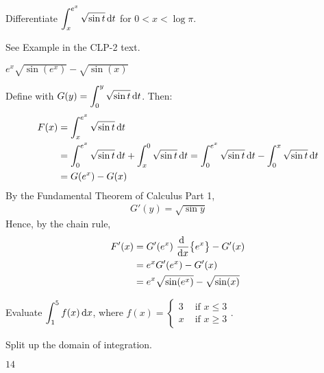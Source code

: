 \begin{question}[2014D]
Differentiate
$\displaystyle \int_x^{e^x} \sqrt{\sin t}\,\mathrm{d}t$ for $0<x<\log \pi$.
\end{question}

\begin{hint}
See Example  in the
CLP-2 text.
\end{hint}

\begin{answer}
$e^x\sqrt{\sin(e^x)} -\sqrt{\sin(x)}$
\end{answer}

\begin{solution}
Define
with
$G(y) = \displaystyle\int_0^y \sqrt{\sin t}\,\mathrm{d}t$.
Then:
\begin{align*}
F(x)&=\int_x^{e^x} \sqrt{\sin t}\,\mathrm{d}t \\
&= \int_0^{e^x} \sqrt{\sin t}\,\mathrm{d}t + \int_x^0 \sqrt{\sin t}\,\mathrm{d}t
= \int_0^{e^x} \sqrt{\sin t}\,\mathrm{d}t - \int_0^x \sqrt{\sin t}\,\mathrm{d}t \\
&=G(e^x) - G(x)
\end{align*}
By the Fundamental Theorem of Calculus Part 1,
\begin{align*}
G'(y)=\sqrt{\sin y}\qquad
\end{align*}
Hence, by the chain rule,
\begin{align*}
F'(x) &= G'(e^x)\ \diff{}{x}\big\{e^x\big\} - G'(x)\\
 &=  e^xG'(e^x) - G'(x)\\
&=e^x\sqrt{\sin(e^x)} -\sqrt{\sin(x)}
\end{align*}
\end{solution}



\begin{question}[M105 2014A]
Evaluate $\displaystyle \int_1^5 f(x)\,\mathrm{d}x$, where
$\displaystyle f(x)= \begin{cases} 3 &\text{ if $x\le 3$} \\
                                   x &\text{ if $x\ge 3$}
                     \end{cases}$.
\end{question}

\begin{hint}
Split up the domain of integration.
\end{hint}

\begin{answer}
$14$
\end{answer}


